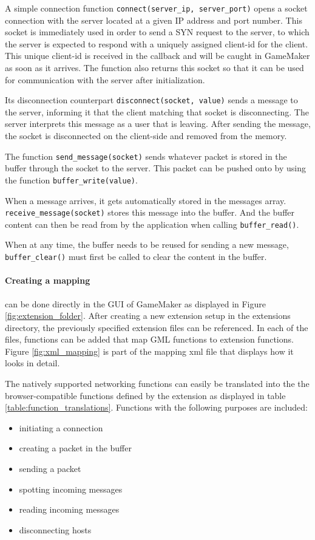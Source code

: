 \documentclass[bsc, 12pt, twoside, singlespacing, parskip, abbrevs, notimes, normalheadings, logo, deptreport]{styles/infthesis}
\begin{document}
A simple connection function \texttt{connect(server\_ip, server\_port)} opens a socket connection with the server located at a given IP address and port number.
This socket is immediately used in order to send a SYN request to the server, to which the server is expected to respond with a uniquely assigned client-id for the client. This unique client-id is received in the callback and will be caught in GameMaker as soon as it arrives.
The function also returns this socket so that it can be used for communication with the server after initialization.

Its disconnection counterpart \texttt{disconnect(socket, value)} sends a message to the server, informing it that the client matching that socket is disconnecting. The server interprets this message as a user that is leaving.
After sending the message, the socket is disconnected on the client-side and removed from the memory.

The function \texttt{send\_message(socket)} sends whatever packet is stored in the buffer through the socket to the server.
This packet can be pushed onto by using the function \texttt{buffer\_write(value)}.

When a message arrives, it gets automatically stored in the messages array. \texttt{receive\_message(socket)} stores this message into the buffer. And the buffer content can then be read from by the application when calling \texttt{buffer\_read()}.

When at any time, the buffer needs to be reused for sending a new message, \texttt{buffer\_clear()} must first be called to clear the content in the buffer. 

\paragraph*{Creating a mapping}
can be done directly in the GUI of GameMaker as displayed in Figure \ref{fig:extension_folder}. After creating a new extension setup in the extensions directory, the previously specified extension files can be referenced. In each of the files, functions can be added that map GML functions to extension functions. Figure \ref{fig:xml_mapping} is part of the mapping xml file that displays how it looks in detail.

The natively supported networking functions can easily be translated into the the browser-compatible functions defined by the extension as displayed in table \ref{table:function_translations}. Functions with the following purposes are included:
\begin{itemize}
	\item initiating a connection
	\item creating a packet in the buffer
	\item sending a packet
	\item spotting incoming messages
	\item reading incoming messages
	\item disconnecting hosts
\end{itemize} 
\end{document}
